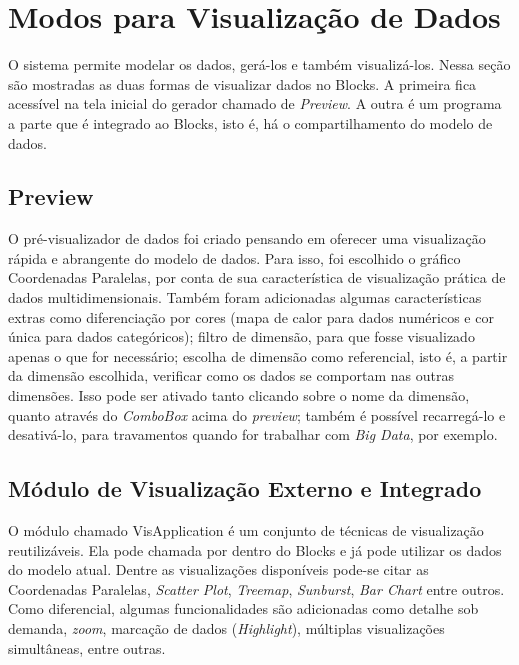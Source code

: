\documentclass[
	12pt,				%
	openright,			%
	oneside,			%
	a4paper,			%
	english,			%
	brazil				%
	]{abntex2}
\begin{document}
	\section{Modos para Visualização de Dados}
		O sistema permite modelar os dados, gerá-los e também visualizá-los.
		Nessa seção são mostradas as duas formas de visualizar dados no Blocks.
		A primeira fica acessível na tela inicial do gerador chamado de \emph{Preview}.
		A outra é um programa a parte que é integrado ao Blocks, isto é, há o compartilhamento do modelo de dados.

		\subsection{Preview}
			O pré-visualizador de dados foi criado pensando em oferecer uma visualização rápida e abrangente do modelo de dados.
			Para isso, foi escolhido o gráfico Coordenadas Paralelas, por conta de sua característica de visualização prática de dados multidimensionais.
			Também foram adicionadas algumas características extras como diferenciação por cores (mapa de calor para dados numéricos e cor única para dados categóricos); 
				filtro de dimensão, para que fosse visualizado apenas o que for necessário;
				escolha de dimensão como referencial, isto é, a partir da dimensão escolhida, verificar como os dados se comportam nas outras dimensões. Isso pode ser ativado tanto clicando sobre o nome da dimensão, quanto através do \emph{ComboBox} acima do \emph{preview};
				também é possível recarregá-lo e desativá-lo, para travamentos quando for trabalhar com \emph{Big Data}, por exemplo.

		\subsection{Módulo de Visualização Externo e Integrado}
			O módulo chamado VisApplication é um conjunto de técnicas de visualização reutilizáveis.
			Ela pode chamada por dentro do Blocks e já pode utilizar os dados do modelo atual.
			Dentre as visualizações disponíveis pode-se citar as Coordenadas Paralelas, \emph{Scatter Plot}, \emph{Treemap}, \emph{Sunburst}, \emph{Bar Chart} entre outros.
			Como diferencial, algumas funcionalidades são adicionadas como detalhe sob demanda, \emph{zoom}, marcação de dados (\emph{Highlight}), múltiplas visualizações simultâneas, entre outras.
	
\end{document}
